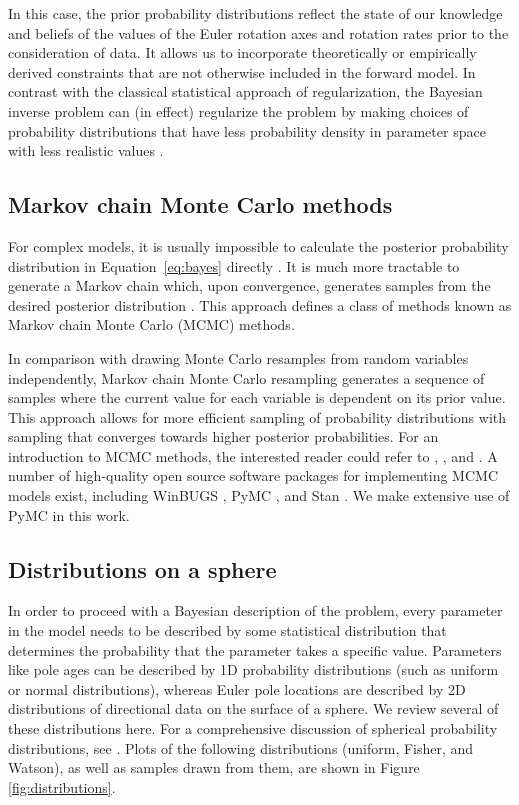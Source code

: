 \documentclass[11pt,letterpaper]{article}
\begin{document}
In this case, the prior probability distributions reflect the state of our knowledge and beliefs of the values of the Euler rotation axes and rotation rates prior to the consideration of data. It allows us to incorporate theoretically or empirically derived constraints that are not otherwise included in the forward model. In contrast with the classical statistical approach of regularization, the Bayesian inverse problem can (in effect) regularize the problem by making
choices of probability distributions that have less probability density in parameter space with less realistic values \citep[e.g.][]{Minson2013a, Sambridge2013a}.

\subsection*{Markov chain Monte Carlo methods}

For complex models, it is usually impossible to calculate the posterior probability distribution in Equation~\eqref{eq:bayes} directly \citep{Davidson-Pilon2015a}. It is much more tractable to generate a Markov chain which, upon convergence, generates samples from the desired posterior distribution \citep{Gelman2013a}. This approach defines a class of methods known as Markov chain Monte Carlo (MCMC) methods. 

In comparison with drawing Monte Carlo resamples from random variables independently, Markov chain Monte Carlo resampling generates a sequence of samples where the current value for each variable is dependent on its prior value. This approach allows for more efficient sampling of probability distributions with sampling that converges towards higher posterior probabilities. For an introduction to MCMC methods, the interested reader could refer to \cite{Gelman1996a}, \cite{Sambridge2013a}, and \cite{Davidson-Pilon2015a}. A number of high-quality open source software packages for implementing MCMC models exist, including WinBUGS \citep{Lunn2000a}, PyMC \citep{Salvatier2016a}, and Stan \citep{Carpenter2017a}. We make extensive use of PyMC in this work.

\subsection*{Distributions on a sphere}

In order to proceed with a Bayesian description of the problem, every parameter in the model needs to be described by some statistical distribution that determines the probability that the parameter takes a specific value. Parameters like pole ages can be described by 1D probability distributions (such as uniform or normal distributions), whereas Euler pole locations are described by 2D distributions of directional data on the surface of a sphere. We review several of these distributions here. For a comprehensive discussion of spherical probability distributions, see \cite{Fisher1987b}. Plots of the following distributions (uniform, Fisher, and Watson), as well as samples drawn from them, are shown in Figure \ref{fig:distributions}. 
\end{document}
